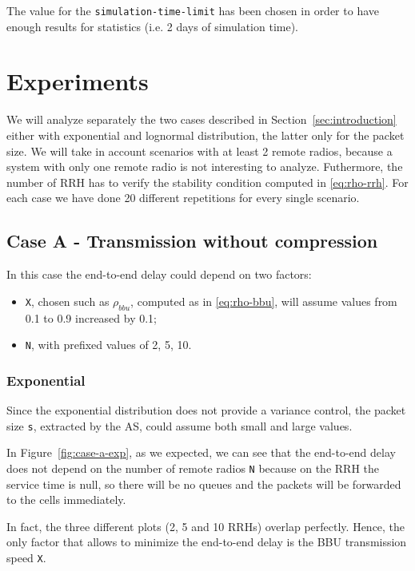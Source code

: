 \documentclass[11pt,a4paper,oneside, openright]{article}
\begin{document}
The value for the \texttt{simulation-time-limit} has been chosen in order to have enough results for statistics (i.e. 2 days of simulation time).

\section{Experiments}
We will analyze separately the two cases described in Section~\ref{sec:introduction} either with exponential and lognormal distribution, the latter only for the packet size.
We will take in account scenarios with at least 2 remote radios, because a system with only one remote radio is not interesting to analyze. Futhermore, the number of RRH has to verify the stability condition computed in \ref{eq:rho-rrh}. For each case we have done 20 different repetitions for every single scenario.

\subsection{Case A - Transmission without compression}
In this case the end-to-end delay could depend on two factors:
\begin{itemize}
	\item \texttt{X}, chosen such as $ \rho_{bbu} $, computed as in \ref{eq:rho-bbu}, will assume values from 0.1 to 0.9 increased by 0.1;
	\item \texttt{N}, with prefixed values of 2, 5, 10.
\end{itemize}
\subsubsection{Exponential}
Since the exponential distribution does not provide a variance control, the packet size \texttt{s}, extracted by the AS, could assume both small and large values.

In Figure~\ref{fig:case-a-exp}, as we expected, we can see that the end-to-end delay does not depend on the number of remote radios \texttt{N} because on the RRH the service time is null, so there will be no queues and the packets will be forwarded to the cells immediately.

In fact, the three different plots (2, 5 and 10 RRHs) overlap perfectly.
Hence, the only factor that allows to minimize the end-to-end delay is the BBU transmission speed \texttt{X}.


\end{document}

